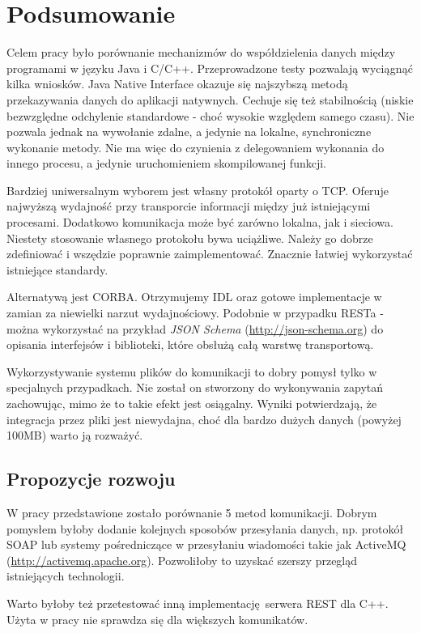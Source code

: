 \chapter{Podsumowanie}

Celem pracy było porównanie mechanizmów do współdzielenia danych między programami w języku Java i C/C++. Przeprowadzone testy pozwalają wyciągnąć kilka wniosków.
Java Native Interface okazuje się najszybszą metodą przekazywania danych do aplikacji natywnych. Cechuje się też stabilnością (niskie bezwzględne odchylenie standardowe - choć wysokie względem samego czasu). Nie pozwala jednak na wywołanie zdalne, a jedynie na lokalne, synchroniczne wykonanie metody. Nie ma więc do czynienia z delegowaniem wykonania do innego procesu, a jedynie uruchomieniem skompilowanej funkcji.

Bardziej uniwersalnym wyborem jest własny protokół oparty o TCP. Oferuje najwyższą wydajność przy transporcie informacji między już istniejącymi procesami. Dodatkowo komunikacja może być zarówno lokalna, jak i sieciowa. Niestety stosowanie własnego protokołu bywa uciążliwe. Należy go dobrze zdefiniować i wszędzie poprawnie zaimplementować. Znacznie łatwiej wykorzystać istniejące standardy.

Alternatywą jest CORBA. Otrzymujemy IDL oraz gotowe implementacje w zamian za niewielki narzut wydajnościowy. Podobnie w przypadku RESTa - można wykorzystać na przykład \textit{JSON Schema} (\url{http://json-schema.org}) do opisania interfejsów i biblioteki, które obsłużą całą warstwę transportową.

Wykorzystywanie systemu plików do komunikacji to dobry pomysł tylko w specjalnych przypadkach. Nie został on stworzony do wykonywania zapytań zachowując, mimo że to takie efekt jest osiągalny. Wyniki potwierdzają, że integracja przez pliki jest niewydajna, choć dla bardzo dużych danych (powyżej 100MB) warto ją rozważyć.


\section{Propozycje rozwoju}

W pracy przedstawione zostało porównanie 5 metod komunikacji. Dobrym pomysłem byłoby dodanie kolejnych sposobów przesyłania danych, np. protokół SOAP lub systemy pośredniczące w przesyłaniu wiadomości takie jak ActiveMQ (\url{http://activemq.apache.org}). Pozwoliłoby to uzyskać szerszy przegląd istniejących technologii.

Warto byłoby też przetestować inną implementację serwera REST dla C++. Użyta w pracy nie sprawdza się dla większych komunikatów.

